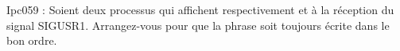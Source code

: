 \begin{list}{+}{}
\item Ipc059 :
Soient deux processus qui affichent respectivement  et  à la réception du signal SIGUSR1. Arrangez-vous pour que la phrase  soit toujours écrite dans le bon ordre.





\end{list}


